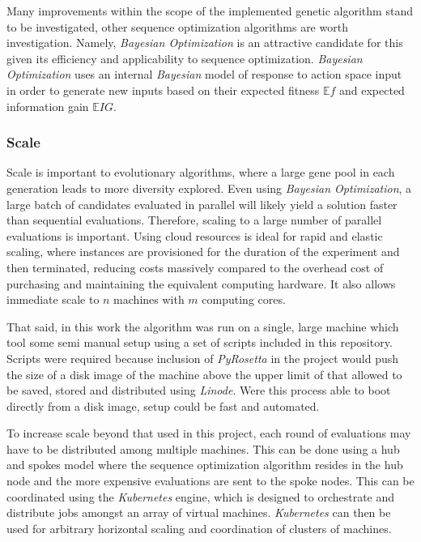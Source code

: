 \documentclass[16pt]{article}
\begin{document}
Many improvements within the scope of the implemented genetic algorithm stand to be investigated, other sequence optimization algorithms are worth investigation.
Namely, \textit{Bayesian Optimization} is an attractive candidate for this given its efficiency and applicability to sequence optimization.
\textit{Bayesian Optimization} uses an internal \textit{Bayesian} model of response to action space input in order to generate new inputs based on their expected fitness  $\mathbb{E} f$ and expected information gain $\mathbb{E}IG$.

\subsubsection{Scale}

Scale is important to evolutionary algorithms, where a large gene pool in each generation leads to more diversity explored.
Even using \textit{Bayesian Optimization}, a large batch of candidates evaluated in parallel will likely yield a solution faster than sequential evaluations.
Therefore, scaling to a large number of parallel evaluations is important.
Using cloud resources is ideal for rapid and elastic scaling, where instances are provisioned for the duration of the experiment and then terminated, reducing costs massively compared to the overhead cost of purchasing and maintaining the equivalent computing hardware.
It also allows immediate scale to $n$ machines with $m$ computing cores.

That said, in this work the algorithm was run on a single, large machine which tool some semi manual setup using a set of scripts included in this repository.
Scripts were required because inclusion of \textit{PyRosetta} in the project would push the size of a disk image of the machine above the upper limit of that allowed to be saved, stored and distributed using \textit{Linode}.
Were this process able to boot directly from a disk image, setup could be fast and automated.

To increase scale beyond that used in this project, each round of evaluations may have to be distributed among multiple machines.
This can be done using a hub and spokes model where the sequence optimization algorithm resides in the hub node and the more expensive evaluations are sent to the spoke nodes.
This can be coordinated using the \textit{Kubernetes} engine, which is designed to orchestrate and distribute jobs amongst an array of virtual machines.
\textit{Kubernetes} can then be used for arbitrary horizontal scaling and coordination of clusters of machines.
\end{document}
